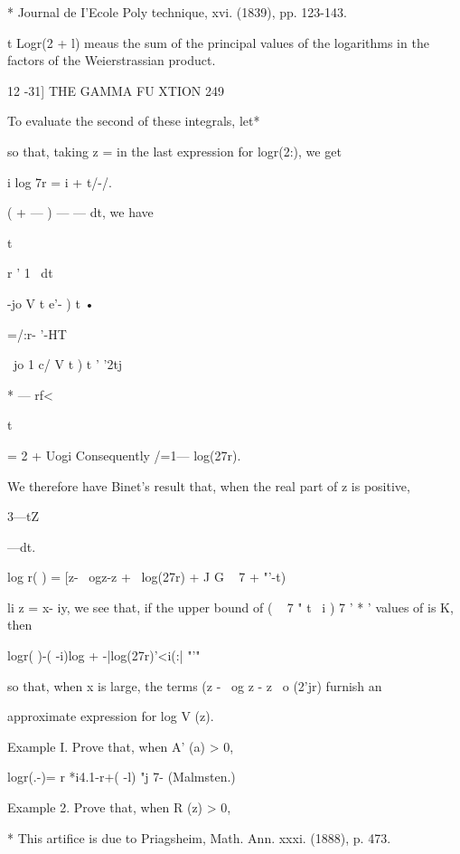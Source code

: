 * Journal de I'Ecole Poly technique, xvi. (1839), pp. 123-143. 

t Logr(2 + l) meaus the sum of the principal values of the logarithms in the factors of 
the Weierstrassian product. 



12 -31] THE GAMMA FU XTION 249 

To evaluate the second of these integrals, let* 

so that, taking z =   in the last expression for logr(2:), we get 

i log 7r = i + t/-/. 



( + — ) — — dt, we have 



t 

r ' 1 \ dt 



-jo V t e'- )  t • 

=/:r- '-HT 

~jo 1 c/ V t ) t ' '2tj 



*  — rf< 

t 



= 2 + Uogi 
Consequently /=1—  log(27r). 

We therefore have Binet's result that, when the real part of z is positive, 

3—tZ 



 —dt. 



log r( ) = [z- \ ogz-z + \ log(27r) + J  G ~ 7 +  "'-t) 

li z = x-  iy, we see that, if the upper bound of (   ~ 7 "  t \  i ) 7 ' *  '   
values of   is K, then 

logr( )-( -i)log  +  -|log(27r)'<i(:| "'"  

so that, when x is large, the terms (z -  \ og z - z     \ o  (2'jr) furnish an 

approximate expression for log V (z). 

Example I. Prove that, when A' (a) > 0,   

logr(.-)= r  *i4.1-r+( -l) "j 7- (Malmsten.) 

Example 2. Prove that, when R (z) > 0, 

* This artifice is due to Priagsheim, Math. Ann. xxxi. (1888), p. 473. 



